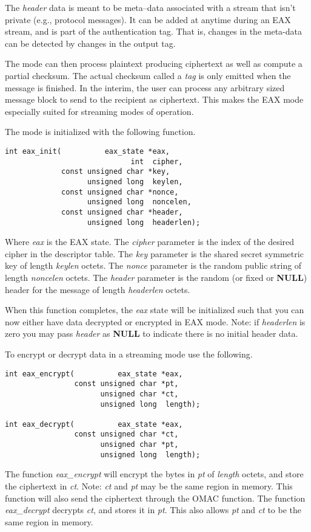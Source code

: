 \documentclass[synpaper]{book}
\begin{document}
The \textit{header} data is meant to be meta--data associated with a stream that isn't private (e.g., protocol messages).  It can
be added at anytime during an EAX stream, and is part of the authentication tag.  That is, changes in the meta-data can be detected by changes in the output tag.

The mode can then process plaintext producing ciphertext as well as compute a partial checksum.  The actual checksum
called a \textit{tag} is only emitted when the message is finished.  In the interim, the user can process any arbitrary
sized message block to send to the recipient as ciphertext.  This makes the EAX mode especially suited for streaming modes
of operation.

The mode is initialized with the following function.
\begin{verbatim}
int eax_init(          eax_state *eax, 
                             int  cipher, 
             const unsigned char *key, 
                   unsigned long  keylen,
             const unsigned char *nonce, 
                   unsigned long  noncelen,
             const unsigned char *header, 
                   unsigned long  headerlen);
\end{verbatim}

Where \textit{eax} is the EAX state.  The \textit{cipher} parameter is the index of the desired cipher in the descriptor table.  
The \textit{key} parameter is the shared secret symmetric key of length \textit{keylen} octets.  The \textit{nonce} parameter is the 
random public string of length \textit{noncelen} octets.  The \textit{header} parameter is the random (or fixed or \textbf{NULL}) header for the 
message of length \textit{headerlen} octets.

When this function completes, the \textit{eax} state will be initialized such that you can now either have data decrypted or 
encrypted in EAX mode.  Note: if \textit{headerlen} is zero you may pass \textit{header} as \textbf{NULL} to indicate there is no initial header data.

To encrypt or decrypt data in a streaming mode use the following.
 
\begin{verbatim}
int eax_encrypt(          eax_state *eax, 
                const unsigned char *pt, 
                      unsigned char *ct, 
                      unsigned long  length);

int eax_decrypt(          eax_state *eax, 
                const unsigned char *ct, 
                      unsigned char *pt, 
                      unsigned long  length);
\end{verbatim}
The function \textit{eax\_encrypt} will encrypt the bytes in \textit{pt} of \textit{length} octets, and store the ciphertext in
\textit{ct}.  Note: \textit{ct} and \textit{pt} may be the same region in memory.   This function will also send the ciphertext
through the OMAC function.  The function \textit{eax\_decrypt} decrypts \textit{ct}, and stores it in \textit{pt}.  This also allows 
\textit{pt} and \textit{ct} to be the same region in memory.  
\end{document}

